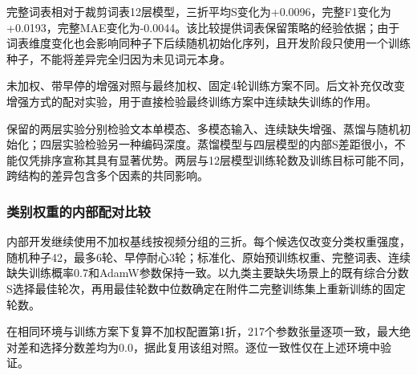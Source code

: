 完整词表相对于裁剪词表12层模型，三折平均S变化为+0.0096，完整F1变化为+0.0193，完整MAE变化为-0.0044。该比较提供词表保留策略的经验依据；由于词表维度变化也会影响同种子下后续随机初始化序列，且开发阶段只使用一个训练种子，不能将差异完全归因为未见词元本身。

未加权、带早停的增强对照与最终加权、固定4轮训练方案不同。后文补充仅改变增强方式的配对实验，用于直接检验最终训练方案中连续缺失训练的作用。

保留的两层实验分别检验文本单模态、多模态输入、连续缺失增强、蒸馏与随机初始化；四层实验检验另一种编码深度。蒸馏模型与四层模型的内部S差距很小，不能仅凭排序宣称其具有显著优势。两层与12层模型训练轮数及训练目标可能不同，跨结构的差异包含多个因素的共同影响。

\hypertarget{q2-ux7c7bux522bux6743ux91cdux7684ux5185ux90e8ux914dux5bf9ux6bd4ux8f83}{%
\subsubsection{类别权重的内部配对比较}\label{q2-ux7c7bux522bux6743ux91cdux7684ux5185ux90e8ux914dux5bf9ux6bd4ux8f83}}

内部开发继续使用不加权基线按视频分组的三折。每个候选仅改变分类权重强度，随机种子42，最多6轮、早停耐心3轮；标准化、原始预训练权重、完整词表、连续缺失训练概率0.7和AdamW参数保持一致。以九类主要缺失场景上的既有综合分数S选择最佳轮次，再用最佳轮数中位数确定在附件二完整训练集上重新训练的固定轮数。

在相同环境与训练方案下复算不加权配置第1折，217个参数张量逐项一致，最大绝对差和选择分数差均为0.0，据此复用该组对照。逐位一致性仅在上述环境中验证。


